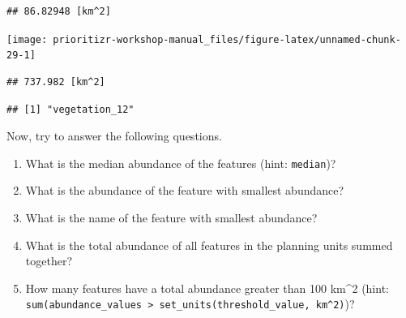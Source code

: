 \documentclass[
  12pt,
]{book}
\makeatletter
\newenvironment{Shaded}{\begin{snugshade}}{\end{snugshade}}
\newcommand{\AttributeTok}[1]{\textcolor[rgb]{0.77,0.63,0.00}{#1}}
\newcommand{\CommentTok}[1]{\textcolor[rgb]{0.56,0.35,0.01}{\textit{#1}}}
\newcommand{\FunctionTok}[1]{\textcolor[rgb]{0.00,0.00,0.00}{#1}}
\newcommand{\NormalTok}[1]{#1}
\newcommand{\SpecialCharTok}[1]{\textcolor[rgb]{0.00,0.00,0.00}{#1}}
\newcommand{\StringTok}[1]{\textcolor[rgb]{0.31,0.60,0.02}{#1}}
\providecommand{\tightlist}{%
  \setlength{\itemsep}{0pt}\setlength{\parskip}{0pt}}
\newenvironment{kframe}{%
\medskip{}
\setlength{\fboxsep}{.8em}
 \def\at@end@of@kframe{}%
 \ifinner\ifhmode%
  \def\at@end@of@kframe{\end{minipage}}%
  \begin{minipage}{\columnwidth}%
 \fi\fi%
 \def\FrameCommand##1{\hskip\@totalleftmargin \hskip-\fboxsep
 \colorbox{shadecolor}{##1}\hskip-\fboxsep
     \hskip-\linewidth \hskip-\@totalleftmargin \hskip\columnwidth}%
 \MakeFramed {\advance\hsize-\width
   \@totalleftmargin\z@ \linewidth\hsize
   \@setminipage}}%
 {\par\unskip\endMakeFramed%
 \at@end@of@kframe}
\newenvironment{rmdblock}[1]
  {
  \begin{itemize}
  \renewcommand{\labelitemi}{
    \raisebox{-.7\height}[0pt][0pt]{
      {\setkeys{Gin}{width=3em,keepaspectratio}\texttt{[image: images/\#1]}}
    }
  }
  \setlength{\fboxsep}{1em}
  \begin{kframe}
  \item
  }
  {
  \end{kframe}
  \end{itemize}
  }
\newenvironment{rmdquestion}
  {\begin{rmdblock}{question}}
  {\end{rmdblock}}
\makeatother
\begin{document}
\begin{verbatim}
## 86.82948 [km^2]
\end{verbatim}

\begin{Shaded}
\end{Shaded}

\begin{center}\texttt{[image: prioritizr-workshop-manual\_files/figure-latex/unnamed-chunk-29-1]} \end{center}

\begin{Shaded}
\end{Shaded}

\begin{verbatim}
## 737.982 [km^2]
\end{verbatim}

\begin{Shaded}
\end{Shaded}

\begin{verbatim}
## [1] "vegetation_12"
\end{verbatim}

Now, try to answer the following questions.

\begin{rmdquestion}
\begin{enumerate}
\def\labelenumi{\arabic{enumi}.}
\tightlist
\item
  What is the median abundance of the features (hint: \texttt{median})?
\item
  What is the abundance of the feature with smallest abundance?
\item
  What is the name of the feature with smallest abundance?
\item
  What is the total abundance of all features in the planning units summed together?
\item
  How many features have a total abundance greater than 100 km\^{}2 (hint: \texttt{sum(abundance\_values\ \textgreater{}\ set\_units(threshold\_value,\ km\^{}2)})?
\end{enumerate}
\end{rmdquestion}
\end{document}
